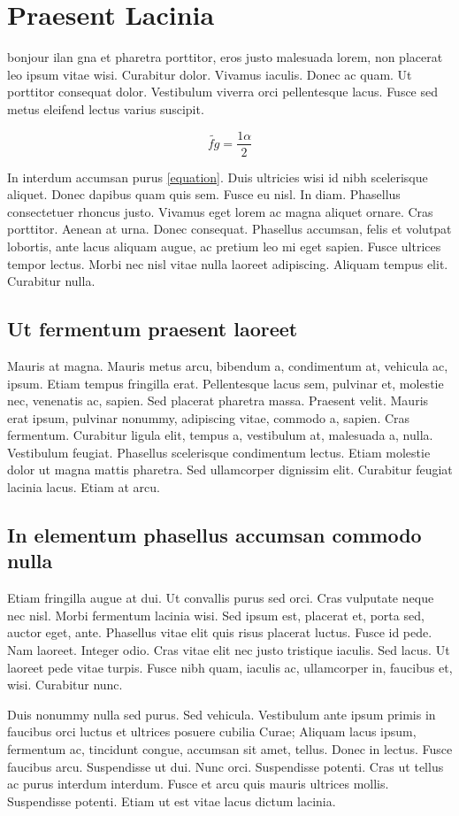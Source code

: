 

\chapter{Praesent Lacinia}
 bonjour ilan gna et pharetra porttitor, eros justo malesuada lorem,
non placerat leo ipsum vitae wisi. Curabitur dolor. Vivamus
iaculis. Donec ac quam. Ut porttitor consequat dolor. Vestibulum
viverra orci pellentesque lacus. Fusce sed metus eleifend lectus
varius suscipit.

\begin{equation}\label{equation}
    \widetilde{fg}= \frac{1\alpha}{2}
\end{equation}

In interdum accumsan purus \ref{equation}. Duis ultricies wisi id
nibh scelerisque aliquet. Donec dapibus quam quis sem. Fusce eu
nisl. In diam. Phasellus consectetuer rhoncus justo. Vivamus eget
lorem ac magna aliquet ornare. Cras porttitor. Aenean at urna.
Donec consequat. Phasellus accumsan, felis et volutpat lobortis,
ante lacus aliquam augue, ac pretium leo mi eget sapien. Fusce
ultrices tempor lectus. Morbi nec nisl vitae nulla laoreet
adipiscing. Aliquam tempus elit. Curabitur nulla.

\section{Ut fermentum praesent laoreet} Mauris at magna. Mauris
metus arcu, bibendum a, condimentum at, vehicula ac, ipsum. Etiam
tempus fringilla erat. Pellentesque lacus sem, pulvinar et,
molestie nec, venenatis ac, sapien. Sed placerat pharetra massa.
Praesent velit. Mauris erat ipsum, pulvinar nonummy, adipiscing
vitae, commodo a, sapien. Cras fermentum. Curabitur ligula elit,
tempus a, vestibulum at, malesuada a, nulla. Vestibulum feugiat.
Phasellus scelerisque condimentum lectus. Etiam molestie dolor ut
magna mattis pharetra. Sed ullamcorper dignissim elit. Curabitur
feugiat lacinia lacus. Etiam at arcu.

\section{In elementum phasellus accumsan commodo nulla} Etiam
fringilla augue at dui. Ut convallis purus sed orci. Cras
vulputate neque nec nisl. Morbi fermentum lacinia wisi. Sed ipsum
est, placerat et, porta sed, auctor eget, ante. Phasellus vitae
elit quis risus placerat luctus. Fusce id pede. Nam laoreet.
Integer odio. Cras vitae elit nec justo tristique iaculis. Sed
lacus. Ut laoreet pede vitae turpis. Fusce nibh quam, iaculis ac,
ullamcorper in, faucibus et, wisi. Curabitur nunc.

 Duis nonummy nulla sed purus.
Sed vehicula. Vestibulum ante ipsum primis in faucibus orci luctus
et ultrices posuere cubilia Curae; Aliquam lacus ipsum, fermentum
ac, tincidunt congue, accumsan sit amet, tellus. Donec in lectus.
Fusce faucibus arcu. Suspendisse ut dui. Nunc orci. Suspendisse
potenti. Cras ut tellus ac purus interdum interdum. Fusce et arcu
quis mauris ultrices mollis. Suspendisse potenti. Etiam ut est
vitae lacus dictum lacinia.
